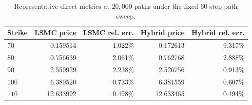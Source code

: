 \begin{table}[htbp]
\centering
\caption{Representative direct metrics at $20{,}000$ paths under the fixed 60-step path sweep.}
\label{tab:bgk_r03_v004_t1_delta05_nex12-path60-path20k}
\begin{tabular}{lrrrr}
\toprule
Strike & LSMC price & LSMC rel. err. & Hybrid price & Hybrid rel. err. \\
\midrule
$70$ & 0.159514 & 1.022\% & 0.172613 & 9.317\% \\
$80$ & 0.756639 & 2.061\% & 0.762768 & 2.888\% \\
$90$ & 2.559929 & 2.238\% & 2.526756 & 0.913\% \\
$100$ & 6.389520 & 0.733\% & 6.381559 & 0.607\% \\
$110$ & 12.633992 & 0.498\% & 12.633465 & 0.494\% \\
\bottomrule
\end{tabular}
\end{table}
